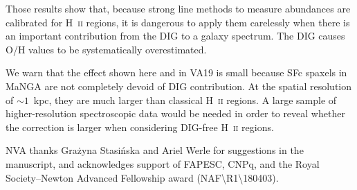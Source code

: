 \documentclass[11pt,twoside]{article}
\newcommand{\hii}{H~{\scshape ii}\xspace}
\begin{document}
Those results show that, because strong line methods to measure
abundances are calibrated for \hii regions, it is dangerous to apply
them carelessly when there is an important contribution from the DIG
to a galaxy spectrum. The DIG causes O/H values to be systematically
overestimated.

We warn that the effect shown here and in VA19 is small because SFc
spaxels in MaNGA are not completely devoid of DIG contribution. At the
spatial resolution of $\sim 1$~kpc, they are much larger than
classical \hii regions. A large sample of higher-resolution
spectroscopic data would be needed in order to reveal whether the
correction is larger when considering DIG-free \hii regions.

\acknowledgments
NVA thanks Gra\.zyna Stasi\'nska and
  Ariel Werle for suggestions in the manuscript, and acknowledges
  support of FAPESC, CNPq, and the Royal Society--Newton
  Advanced Fellowship award
  (NAF\textbackslash{}R1\textbackslash{}180403).



\end{document}
